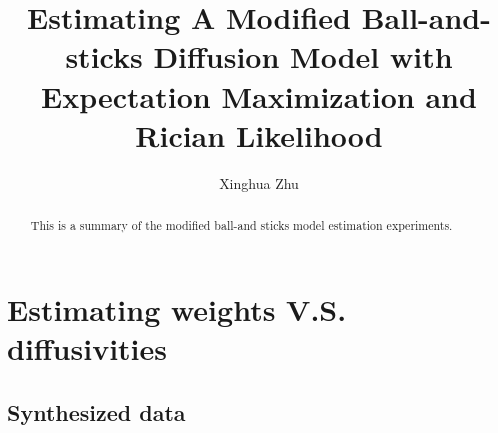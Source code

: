 \documentclass{article}
\begin{document}
\title{Estimating A Modified Ball-and-sticks Diffusion Model with Expectation Maximization and Rician Likelihood}
\author{Xinghua Zhu}

\maketitle

\begin{abstract}
  This is a summary of the modified ball-and sticks model estimation experiments.
\end{abstract}



\section{Estimating weights V.S. diffusivities}
\subsection{Synthesized data}
\end{document}
